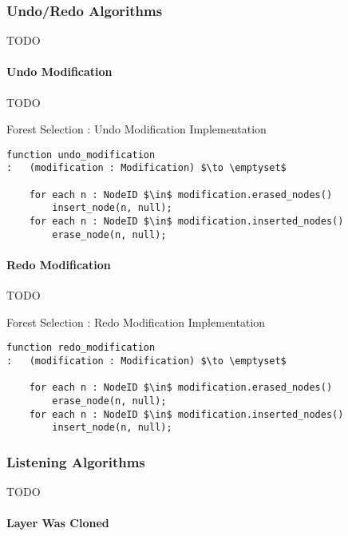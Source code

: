\subsubsection{Undo/Redo Algorithms}

TODO

\paragraph{Undo Modification}

TODO

\begin{stulisting}[p]
\caption{Forest Selection : Undo Modification Implementation}
\label{code:ipfs-selection-undomodification}
\begin{lstlisting}[style=Default]
function undo_modification
:	(modification : Modification) $\to \emptyset$

	for each n : NodeID $\in$ modification.erased_nodes()
		insert_node(n, null);
	for each n : NodeID $\in$ modification.inserted_nodes()
		erase_node(n, null);
\end{lstlisting}
\end{stulisting}

\paragraph{Redo Modification}

TODO

\begin{stulisting}[p]
\caption{Forest Selection : Redo Modification Implementation}
\label{code:ipfs-selection-redomodification}
\begin{lstlisting}[style=Default]
function redo_modification
:	(modification : Modification) $\to \emptyset$

	for each n : NodeID $\in$ modification.erased_nodes()
		erase_node(n, null);
	for each n : NodeID $\in$ modification.inserted_nodes()
		insert_node(n, null);
\end{lstlisting}
\end{stulisting}

\subsubsection{Listening Algorithms}

TODO

\paragraph{Layer Was Cloned}

